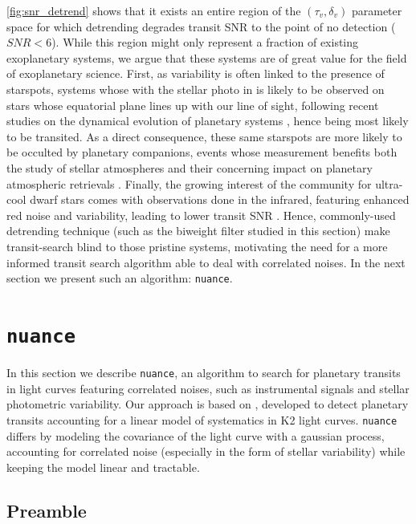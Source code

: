 \documentclass{aastex631}
\begin{document}
\autoref{fig:snr_detrend} shows that it exists an entire region of the $(\tau_v, \delta_v)$ parameter space for which detrending degrades transit SNR to the point of no detection ($SNR < 6$). While this region might only represent a fraction of existing exoplanetary systems, we argue that these systems are of great value for the field of exoplanetary science. First, as variability is often linked to the presence of starspots, systems whose  with the stellar photo in is likely to be observed on stars whose equatorial plane lines up with our line of sight, following recent studies on the dynamical evolution of planetary systems \cite{}, hence being most likely to be transited. As a direct consequence, these same starspots are more likely to be occulted by planetary companions, events whose measurement benefits both the study of stellar atmospheres and their concerning impact on planetary atmospheric retrievals \cite{}. Finally, the growing interest of the community for ultra-cool dwarf stars comes with observations done in the infrared, featuring enhanced red noise and variability, leading to lower transit SNR \cite{}. Hence, commonly-used detrending technique (such as the biweight filter studied in this section) make transit-search blind to those pristine systems, motivating the need for a more informed transit search algorithm able to deal with correlated noises. In the next section we present such an algorithm: \texttt{nuance}.

\newpage
\section{\texttt{nuance}}\label{nuance}

In this section we describe \texttt{nuance}, an algorithm to search for planetary transits in light curves featuring correlated noises, such as instrumental signals and stellar photometric variability. Our approach is based on \cite{foreman2016}, developed to detect planetary transits accounting for a linear model of systematics in K2 light curves. \texttt{nuance} differs by modeling the covariance of the light curve with a gaussian process, accounting for correlated noise (especially in the form of stellar variability) while keeping the model linear and tractable.\\

\subsection{Preamble}
\end{document}
